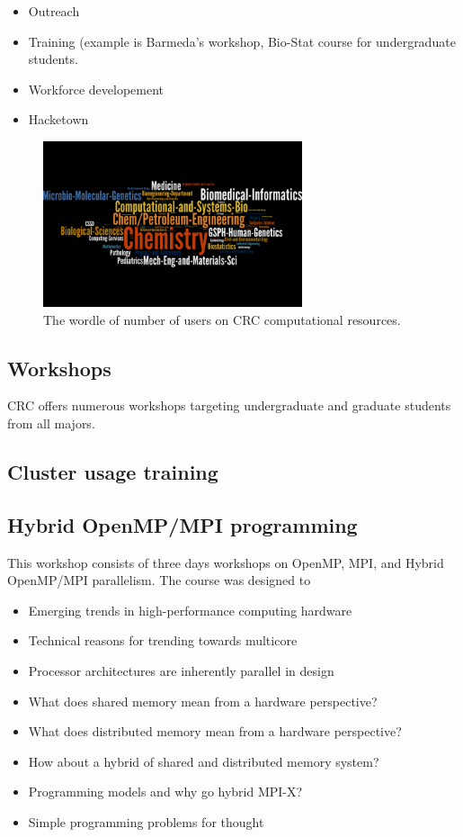 \documentclass[conference]{IEEEtran}
\begin{document}
\begin{itemize}
\item Outreach
\item Training (example is Barmeda's workshop, Bio-Stat course for undergraduate students.
\item Workforce developement
\item Hacketown
\end{itemize}



\begin{figure}
    \centering
    \includegraphics[width=3in]{wordle1}
    \caption{The wordle of number of users on CRC computational resources.}
    \label{fig:wordle1}
\end{figure}


\subsection{Workshops}

CRC offers numerous workshops targeting undergraduate and graduate students from all majors. 

\subsection*{Cluster usage training}

\subsection*{Hybrid OpenMP/MPI programming}
This workshop consists of three days workshops on OpenMP, MPI, and Hybrid OpenMP/MPI parallelism. The course was designed to 

\begin{itemize}
\item Emerging trends in high-performance computing hardware
\item Technical reasons for trending towards multicore
\item Processor architectures are inherently parallel in design
\item What does shared memory mean from a hardware perspective?
\item What does distributed memory mean from a hardware perspective?
\item How about  a hybrid of shared and distributed memory system?
\item Programming models and why go hybrid MPI-X?
\item Simple programming problems for thought
\end{itemize}
\end{document}
